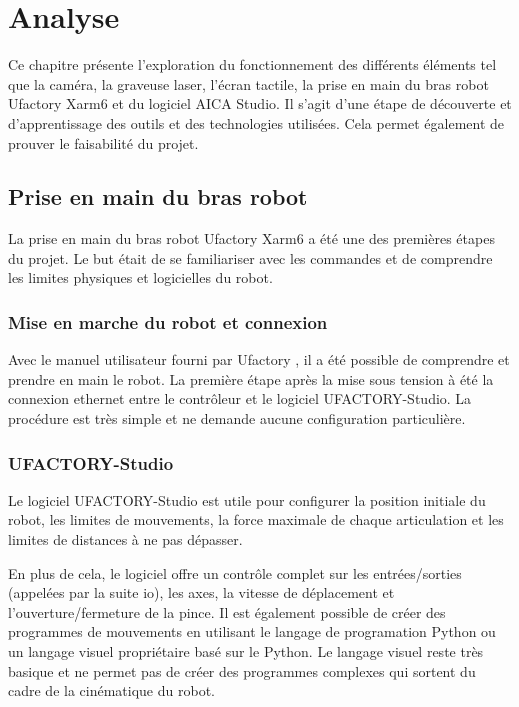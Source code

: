 \chapter{Analyse}
\label{chap:analyse}

Ce chapitre présente l'exploration du fonctionnement des différents éléments tel que la caméra, la graveuse laser, l'écran tactile, la prise en main du bras robot Ufactory Xarm6 et du logiciel AICA Studio. Il s'agit d'une étape de découverte et d'apprentissage des outils et des technologies utilisées. Cela permet également de prouver le faisabilité du projet.

\section{Prise en main du bras robot}
La prise en main du bras robot Ufactory Xarm6 a été une des premières étapes du projet. Le but était de se familiariser avec les commandes et de comprendre les limites physiques et logicielles du robot.

\subsection{Mise en marche du robot et connexion}
Avec le manuel utilisateur fourni par Ufactory \cite{UserManual}, il a été possible de comprendre et prendre en main le robot. La première étape après la mise sous tension à été la connexion ethernet entre le contrôleur et le logiciel UFACTORY-Studio. La procédure est très simple et ne demande aucune configuration particulière.

\subsection{UFACTORY-Studio}
Le logiciel UFACTORY-Studio est utile pour configurer la position initiale du robot, les limites de mouvements, la force maximale de chaque articulation et les limites de distances à ne pas dépasser.

En plus de cela, le logiciel offre un contrôle complet sur les entrées/sorties (appelées par la suite \gls{io}), les axes, la vitesse de déplacement et l'ouverture/fermeture de la pince. Il est également possible de créer des programmes de mouvements en utilisant le langage  de programation Python ou un langage visuel propriétaire basé sur le Python. Le langage visuel reste très basique et ne permet pas de créer des programmes complexes qui sortent du cadre de la cinématique du robot.

